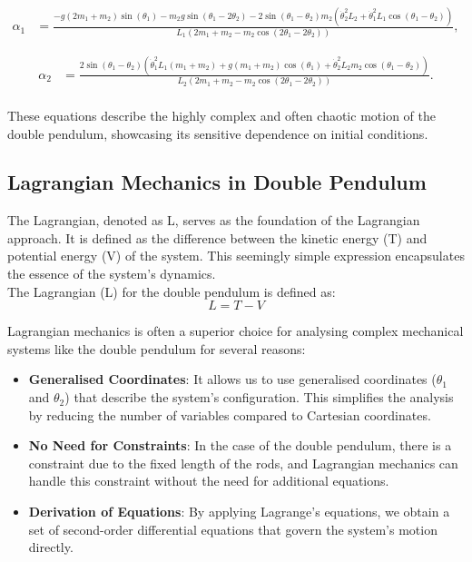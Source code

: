 \documentclass{article}
\begin{document}
\[
\begin{aligned}
\alpha_1 &= \frac{-g (2 m_1 + m_2) \sin(\theta_1) - m_2 g \sin(\theta_1 - 2 \theta_2) - 2 \sin(\theta_1 - \theta_2) m_2 \left( \dot{\theta}_2^2 L_2 + \dot{\theta}_1^2 L_1 \cos(\theta_1 - \theta_2) \right)}{L_1 \left( 2 m_1 + m_2 - m_2 \cos(2 \theta_1 - 2 \theta_2) \right)},
\end{aligned}
\]

\[
\begin{aligned}
\alpha_2 &= \frac{2 \sin(\theta_1 - \theta_2) \left( \dot{\theta}_1^2 L_1 (m_1 + m_2) + g (m_1 + m_2) \cos(\theta_1) + \dot{\theta}_2^2 L_2 m_2 \cos(\theta_1 - \theta_2) \right)}{L_2 \left( 2 m_1 + m_2 - m_2 \cos(2 \theta_1 - 2 \theta_2) \right)}.
\end{aligned}
\]
\\
These equations describe the highly complex and often chaotic motion of the double pendulum, showcasing its sensitive dependence on initial conditions.
 

\subsection{Lagrangian Mechanics in Double Pendulum}
The Lagrangian, denoted as L, serves as the foundation of the Lagrangian approach. It is defined as the difference between the kinetic energy (T) and potential energy (V) of the system. This seemingly simple expression encapsulates the essence of the system's dynamics.\\

The Lagrangian (L) for the double pendulum is defined as:
\[ L=T-V\]

Lagrangian mechanics is often a superior choice for analysing complex mechanical systems like the double pendulum for several reasons:

\begin{itemize}
  \item \textbf{Generalised Coordinates}: It allows us to use generalised coordinates (\( \theta_1 \) and \(\theta_2\)) that describe the system's configuration. This simplifies the analysis by reducing the number of variables compared to Cartesian coordinates.
    \\ 
  \item \textbf{No Need for Constraints}: In the case of the double pendulum, there is a constraint due to the fixed length of the rods, and Lagrangian mechanics can handle this constraint without the need for additional equations.
  \item \textbf{Derivation of Equations}: By applying Lagrange's equations, we obtain a set of second-order differential equations that govern the system's motion directly. 
\end{itemize}
\end{document}
